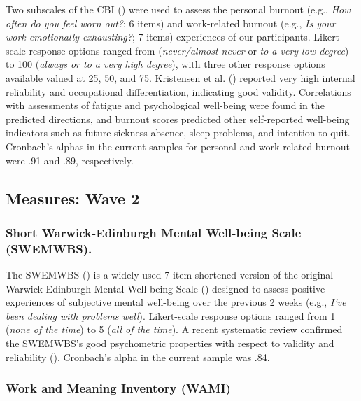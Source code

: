 \documentclass[
  man,
  longtable,
  nolmodern,
  notxfonts,
  notimes,
  colorlinks=true,linkcolor=blue,citecolor=blue,urlcolor=blue]{apa7}
\begin{document}
Two subscales of the CBI
()
were used to assess the personal burnout (e.g., \emph{How often do you
feel worn out?}; 6 items) and work-related burnout (e.g., \emph{Is your
work emotionally exhausting?}; 7 items) experiences of our participants.
Likert-scale response options ranged from (\emph{never/almost never} or
\emph{to a very low degree}) to 100 (\emph{always or to a very high
degree}), with three other response options available valued at 25, 50,
and 75. Kristensen et al.
() reported very high
internal reliability and occupational differentiation, indicating good
validity. Correlations with assessments of fatigue and psychological
well-being were found in the predicted directions, and burnout scores
predicted other self-reported well-being indicators such as future
sickness absence, sleep problems, and intention to quit. Cronbach's
alphas in the current samples for personal and work-related burnout were
.91 and .89, respectively.

\subsection{Measures: Wave 2}\label{measures-wave-2}

\subsubsection{Short Warwick-Edinburgh Mental Well-being Scale
(SWEMWBS).}\label{short-warwick-edinburgh-mental-well-being-scale-swemwbs.}

The SWEMWBS () is a
widely used 7-item shortened version of the original Warwick-Edinburgh
Mental Well-being Scale
()
designed to assess positive experiences of subjective mental well-being
over the previous 2 weeks (e.g., \emph{I've been dealing with problems
well}). Likert-scale response options ranged from 1 (\emph{none of the
time}) to 5 (\emph{all of the time}). A recent systematic review
confirmed the SWEMWBS's good psychometric properties with respect to
validity and reliability (). Cronbach's alpha in the current sample was .84.

\subsubsection{Work and Meaning Inventory
(WAMI)}\label{work-and-meaning-inventory-wami}
\end{document}
